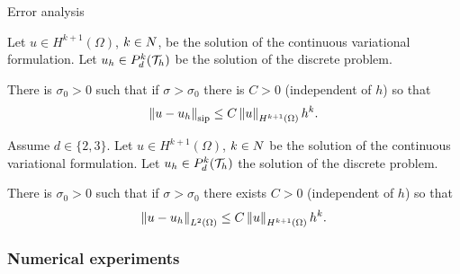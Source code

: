\begin{frame}{Error analysis}
\small
\begin{theorem}
	\label{theorem:eliptico_orden_norma_SIP}
	Let $u\in H^{k+1}(\Omega)$, $k\in\relax N$, be the solution of the continuous variational formulation. Let $u_h\in\relax{P}_d^k(\mathcal{T}_h)$ be the solution of the discrete problem.
	
	There is $\sigma_0>0$ such that if $\sigma>\sigma_0$ there is $C>0$ (independent of $h$) so that $$\left\|u-u_h\right\|_{\text{sip}}\leq C\left\|u\right\|_{H^{k+1}(\Omega)}h^k.$$
\end{theorem}

%	

\begin{theorem}
	\label{corolario:eliptico_orden_norma_L2}
	Assume $d\in\{2,3\}$. Let $u\in H^{k+1}(\Omega)$, $k\in\relax N$ be the solution of the continuous variational formulation. Let $u_h\in\relax{P}_d^k(\mathcal{T}_h)$ the solution of the discrete problem.
	
	There is $\sigma_0>0$ such that if $\sigma>\sigma_0$ there exists $C>0$ (independent of $h$) so that $$\left\|u-u_h\right\|_{L^2(\Omega)}\leq C\left\|u\right\|_{H^{k+1}(\Omega)}h^k.$$
\end{theorem}
\end{frame}

	\subsubsection{Numerical experiments}

